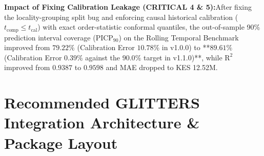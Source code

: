 \documentclass[11pt,a4paper]{article}
\newcommand{\takeaway}[2]{%
  \vspace{6pt}\noindent\colorbox{primary!8}{%
    \parbox{\dimexpr\linewidth-2\fboxsep\relax}{%
      \vspace{3pt}\textbf{\color{primary}#1:}\hspace{0.5em}#2\vspace{3pt}%
    }%
  }\vspace{6pt}%
}
\begin{document}
\takeaway{Impact of Fixing Calibration Leakage (CRITICAL 4 \& 5)}{After fixing the locality-grouping split bug and enforcing causal historical calibration ($t_{\text{comp}} \le t_{\text{cal}}$) with exact order-statistic conformal quantiles, the out-of-sample 90\% prediction interval coverage ($\text{PICP}_{90}$) on the Rolling Temporal Benchmark improved from $79.22\%$ (Calibration Error $10.78\%$ in v1.0.0) to **$89.61\%$ (Calibration Error $0.39\%$ against the $90.0\%$ target in v1.1.0)**, while $\text{R}^2$ improved from $0.9387$ to $0.9598$ and MAE dropped to KES 12.52M.}

\section{Recommended GLITTERS Integration Architecture \& Package Layout}
\end{document}
